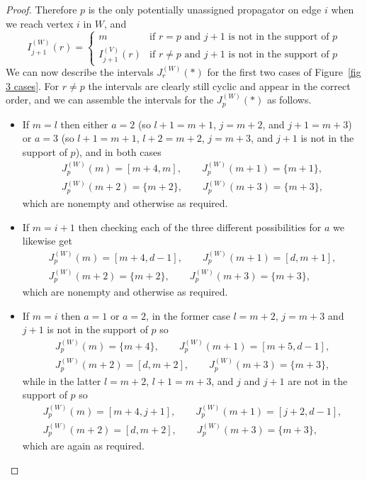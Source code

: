 \documentclass[11pt]{article}
\theoremstyle{remark}
\theoremstyle{definition}
\begin{document}
\begin{proof}
Therefore $p$ is the only potentially unassigned propagator on edge $i$ when we reach vertex $i$ in $W$, and
    \[
    I_{j+1}^{(W)}(r)  = \begin{cases}
      m & \text{if  $r=p$ and $j+1$ is not in the support of $p$}\\
      I_{j+1}^{(V)}(r) & \text{if  $r\neq p$ and $j+1$ is not in the support of $p$}
    \end{cases}
    \]
We can now describe the intervals $J^{(W)}_r(*)$ for the first two cases of Figure~\ref{fig 3 cases}. For $r \neq p$ the intervals are clearly still cyclic and appear in the correct order, and we can assemble the intervals for the $J_p^{(W)}(*)$ as follows.
    \begin{itemize}
      \item 
    If $m=l$ then either $a=2$ (so $l+1=m+1$, $j=m+2$, and $j+1=m+3$) or $a=3$ (so $l+1=m+1$, $l+2=m+2$, $j=m+3$, and $j+1$ is not in the support of $p$), and in both cases
    \begin{gather*}
    J^{(W)}_p(m) = [m+4, m], \qquad  J^{(W)}_p(m+1) = \{m+1\}, \\ J^{(W)}_p(m+2) = \{m+2\}, \qquad  J^{(W)}_p(m+3) = \{m+3\},
    \end{gather*}
    which are nonempty and otherwise as required.
  \item
        If $m=i+1$ then checking each of the three different possibilities for $a$ we likewise get
    \begin{gather*}
    J^{(W)}_p(m) = [m+4, d-1], \qquad  J^{(W)}_p(m+1) = [d, m+1], \\  J^{(W)}_p(m+2) = \{m+2\}, \qquad  J^{(W)}_p(m+3) = \{m+3\},
    \end{gather*}
    which are nonempty and otherwise as required.
  \item If $m=i$ then $a=1$ or $a=2$, in the former case $l=m+2$, $j=m+3$ and $j+1$ is not in the support of $p$ so
    \begin{gather*}
    J^{(W)}_p(m) = \{m+4\}, \qquad  J^{(W)}_p(m+1) = [m+5, d-1], \\  J^{(W)}_p(m+2) = [d, m+2], \qquad  J^{(W)}_p(m+3) = \{m+3\},
    \end{gather*}
    while in the latter $l=m+2$, $l+1=m+3$, and $j$ and $j+1$ are not in the support of $p$ so
    \begin{gather*}
    J^{(W)}_p(m) = [m+4, j+1], \qquad  J^{(W)}_p(m+1) = [j+2, d-1], \\  J^{(W)}_p(m+2) = [d, m+2], \qquad  J^{(W)}_p(m+3) = \{m+3\},
    \end{gather*}
    which are again as required.
    \end{itemize}


\end{proof}
\end{document}

